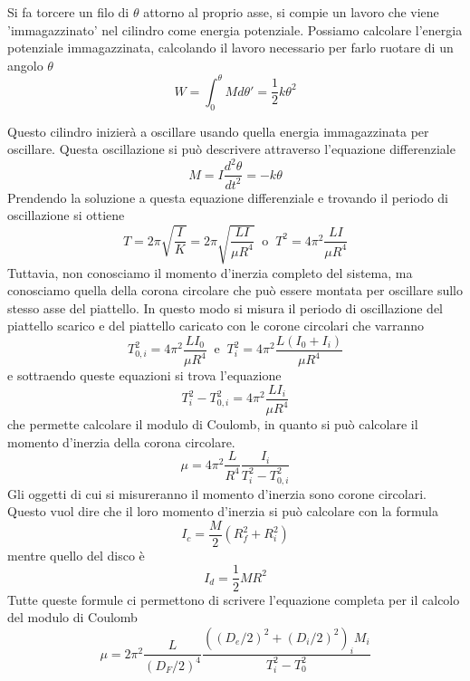 \documentclass[a4paper]{article}
\begin{document}
Si fa torcere un filo di $\theta$ attorno al proprio asse, si compie un lavoro che viene 'immagazzinato' nel cilindro come energia potenziale. Possiamo calcolare l'energia potenziale immagazzinata, calcolando il lavoro necessario per farlo ruotare di un angolo $\theta$
\begin{equation}
    W = \int_{0}^{\theta} M d\theta' = \frac{1}{2}k\theta^2    
\end{equation}

Questo cilindro inizierà a oscillare usando quella energia immagazzinata per oscillare. Questa oscillazione si può descrivere attraverso l'equazione differenziale
\begin{equation}
    M = I \frac{d^2 \theta}{dt^2} = -k\theta
\end{equation}
Prendendo la soluzione a questa equazione differenziale e trovando il periodo di oscillazione si ottiene 
\begin{equation}
    T = 2\pi \sqrt{\frac{I}{K}} = 2\pi \sqrt{\frac{LI}{\mu R^4}} \; \; \text{o} \; \; T^2 = 4\pi^2\frac{LI}{\mu R^4}
\end{equation}
Tuttavia, non conosciamo il momento d'inerzia completo del sistema, ma conosciamo quella della corona circolare che può essere montata per oscillare sullo stesso asse del piattello. In questo modo si misura il periodo di oscillazione del piattello scarico e del piattello caricato con le corone circolari che varranno 
\begin{equation}
    T^2_{0,i} = 4\pi^2 \frac{LI_0}{\mu R^4} \; \; \text{e} \; \; T^2_{i} = 4\pi^2 \frac{L(I_0 + I_i)}{\mu R^4}
\end{equation}
e sottraendo queste equazioni si trova l'equazione 
\begin{equation}
    T^2_i - T^2_{0,i} = 4\pi^2 \frac{LI_i}{\mu R^4}
\end{equation}
che permette calcolare il modulo di Coulomb, in quanto si può calcolare il momento d'inerzia della corona circolare. 
\begin{equation}
    \mu = 4\pi^2 \frac{L}{R^4} \frac{I_i}{T_i^2 - T_{0,i}^2}
\end{equation}
Gli oggetti di cui si misureranno il momento d'inerzia sono corone circolari. Questo vuol dire che il loro momento d'inerzia si può calcolare con la formula 
\begin{equation}
    I_c = \frac{M}{2} (R^2_f + R^2_i)
\end{equation}
mentre quello del disco è 
\begin{equation}
    I_d = \frac{1}{2}MR^2
\end{equation}
Tutte queste formule ci permettono di scrivere l'equazione completa per il calcolo del modulo di Coulomb
\begin{equation}
    \mu = 2\pi^2 \frac{L}{(D_F/2)^4} \frac{((D_e/2)^2 + (D_i/2)^2)_i M_i}{T^2_i-T^2_0}
\end{equation}
\end{document}
